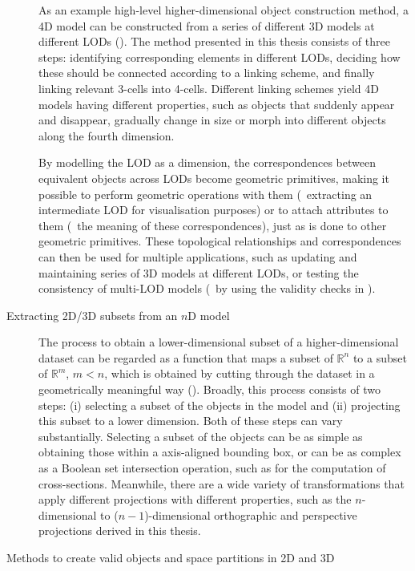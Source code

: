 \begin{description}
As an example high-level higher-dimensional object construction method, a 4D model can be constructed from a series of different 3D models at different LODs ().
The method presented in this thesis consists of three steps: identifying corresponding elements in different LODs, deciding how these should be connected according to a linking scheme, and finally linking relevant 3-cells into 4-cells.
Different linking schemes yield 4D models having different properties, such as objects that suddenly appear and disappear, gradually change in size or morph into different objects along the fourth dimension.

By modelling the LOD as a dimension, the correspondences between equivalent objects across LODs become geometric primitives, making it possible to perform geometric operations with them (\eg\ extracting an intermediate LOD for visualisation purposes) or to attach attributes to them (\eg\ the meaning of these correspondences), just as is done to other geometric primitives.
These topological relationships and correspondences can then be used for multiple applications, such as updating and maintaining series of 3D models at different LODs, or testing the consistency of multi-LOD models (\eg\ by using the validity checks in \citet{Groger11}).


\item[Extracting 2D/3D subsets from an $n$D model]

The process to obtain a lower-dimensional subset of a higher-dimensional dataset can be regarded as a function that maps a subset of $\mathbb{R}^n$ to a subset of $\mathbb{R}^m$, $m < n$, which is obtained by cutting through the dataset in a geometrically meaningful way ().
Broadly, this process consists of two steps: (i) selecting a subset of the objects in the model and (ii) projecting this subset to a lower dimension.
Both of these steps can vary substantially.
Selecting a subset of the objects can be as simple as obtaining those within a axis-aligned bounding box, or can be as complex as a Boolean set intersection operation, such as for the computation of cross-sections.
Meanwhile, there are a wide variety of transformations that apply different projections with different properties, such as the $n$-dimensional to ($n-1$)-dimensional orthographic and perspective projections derived in this thesis.


\item[Methods to create valid objects and space partitions in 2D and 3D]


\end{description}
